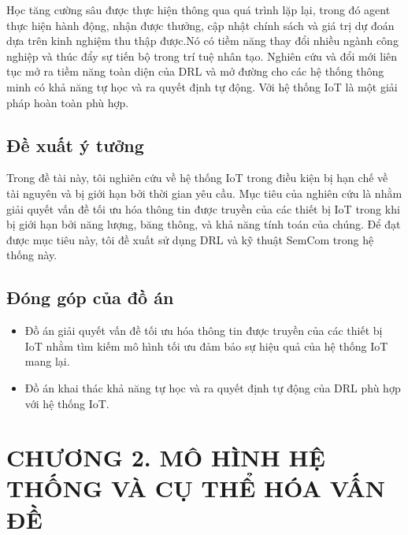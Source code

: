 \documentclass{article} %
\begin{document}
Học tăng cường sâu được thực hiện thông qua quá trình lặp lại, trong đó agent thực hiện hành động, nhận được thưởng, cập nhật chính sách và giá trị dự đoán dựa trên kinh nghiệm thu thập được.Nó có tiềm năng thay đổi nhiều ngành công nghiệp và thúc đẩy sự tiến bộ trong trí tuệ nhân tạo. Nghiên cứu và đổi mới liên tục mở ra tiềm năng toàn diện của DRL và mở đường cho các hệ thống thông minh có khả năng tự học và ra quyết định tự động. Với hệ thống IoT là một giải pháp hoàn toàn phù hợp.


\subsection{Đề xuất ý tưởng}
Trong đề tài này, tôi nghiên cứu về hệ thống IoT trong điều kiện bị hạn chế về tài nguyên và bị  giới hạn bởi thời gian yêu cầu. Mục tiêu của nghiên cứu là nhằm giải quyết vấn đề tối ưu hóa thông tin được truyền của các thiết bị IoT trong khi bị giới hạn bởi năng lượng, băng thông, và khả năng tính toán của chúng. Để đạt được mục tiêu này, tôi đề xuất sử dụng DRL và kỹ thuật SemCom trong hệ thống này. 

\subsection{Đóng góp của đồ án}
\begin{itemize}
\item Đồ án giải quyết vấn đề tối ưu hóa thông tin được truyền của các thiết bị IoT nhằm tìm kiếm mô hình tối ưu đảm bảo sự hiệu quả của hệ thống IoT mang lại.
\item Đồ án khai thác khả năng tự học và ra quyết định tự động của DRL phù hợp với hệ thống IoT.
\end{itemize}

\newpage










\newpage
\section*{CHƯƠNG 2. MÔ HÌNH HỆ THỐNG VÀ CỤ THỂ HÓA VẤN ĐỀ}
\setcounter{section}{2}
\setcounter{subsection}{0}
\setcounter{figure}{0}
\setcounter{table}{0}
\end{document}

